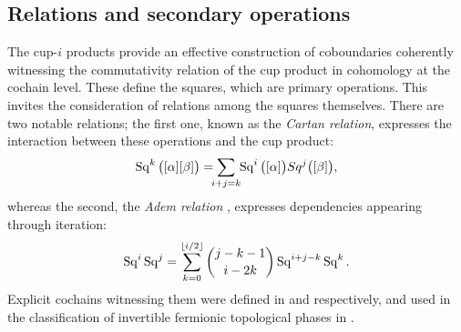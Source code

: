 \subsection{Relations and secondary operations}

The cup-$i$ products provide an effective construction of coboundaries coherently witnessing the commutativity relation of the cup product in cohomology at the cochain level.
These define the squares, which are primary operations.
This invites the consideration of relations among the squares themselves.
There are two notable relations;
the first one, known as the \textit{Cartan relation}, expresses the interaction between these operations and the cup product:
\begin{equation*}
	\Sq^k \big( [\alpha] [\beta] \big) =
	\sum_{\mathclap{i+j=k}} \, \Sq^i\big([\alpha]\big) Sq^j\big([\beta]\big),
\end{equation*}
whereas the second, the \textit{Adem relation} \cite{adem1952iteration}, expresses dependencies appearing through iteration:
\begin{equation*}
	\operatorname{Sq}^i \operatorname{Sq}^j =
	\sum_{k=0}^{\lfloor i/2 \rfloor} \binom{j-k-1}{i-2k} \operatorname{Sq}^{i+j-k} \operatorname{Sq}^k.
\end{equation*}
Explicit cochains witnessing them were defined in \cite{medina2020cartan} and \cite{medina2021adem} respectively, and used in the classification of invertible fermionic topological phases in \cite{kapustin2017fermionic, barkeshli2021classification}.


